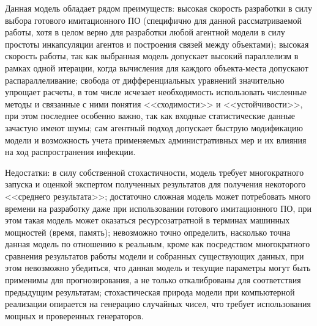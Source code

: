 Данная модель обладает рядом преимуществ: высокая скорость разработки в силу выбора готового имитационного ПО (специфично для данной рассматриваемой работы, хотя в целом верно для разработки любой агентной модели в силу простоты инкапсуляции агентов и построения связей между объектами); высокая скорость работы, так как выбранная модель допускает высокий параллелизм в рамках одной итерации, когда вычисления для каждого объекта-места допускают распараллеливание; свобода от дифференциальных уравнений значительно упрощает расчеты, в том числе исчезает необходимость использовать численные методы и связанные с ними понятия <<сходимости>> и <<устойчивости>>, при этом последнее особенно важно, так как входные статистические данные зачастую имеют шумы;  сам агентный подход допускает быструю модификацию модели и возможность учета применяемых административных мер  и их влияния на ход распространения инфекции.

Недостатки: в силу собственной стохастичности, модель требует многократного запуска  и оценкой экспертом полученных результатов для получения некоторого <<среднего результата>>; достаточно сложная модель может потребовать много времени на разработку даже при использовании готового имитационного ПО, при этом такая модель может оказаться ресурсозатратной в терминах машинных мощностей (время, память); невозможно точно определить, насколько точна данная модель по отношению к реальным, кроме как посредством многократного сравнения результатов работы модели и собранных существующих данных, при этом невозможно убедиться, что данная модель и текущие параметры могут быть применимы для прогнозирования, а не только откалиброваны для соответствия предыдущим результатам; стохастическая природа модели при компьютерной реализации опирается на генерацию случайных чисел, что требует использования мощных и проверенных генераторов. 
